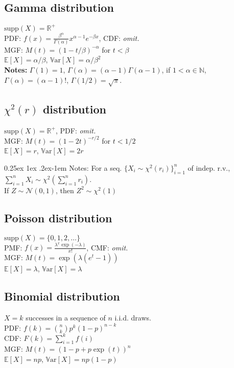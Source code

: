 \documentclass[9pt]{extarticle}
\makeatletter
\newcommand{\RR}{\mathbb{R}}
\newcommand{\NN}{\mathbb{N}}
\newcommand{\EE}{\mathbb{E}}
\newcommand{\var}{\mathbb{V}\text{ar}}
\renewcommand{\paragraph}{%
  \@startsection{paragraph}{4}%
  {\z@}{0.25ex \@plus 1ex \@minus .2ex}{-1em}%
  {\normalfont\normalsize\bfseries}%
}
\newenvironment{noshow}{}{}
\makeatother
\begin{document}
\begin{multicols*}{4}
\subsection*{Gamma distribution}
$\text{supp}(X) = \RR^+$ \\
PDF: $f(x) = \frac{\beta^\alpha}{\Gamma(\alpha)}x^{\alpha-1} e^{-\beta x}$, CDF: \emph{omit.} \\
MGF: $M(t) = (1 - t/\beta)^{-\alpha}$ for $t < \beta$ \\
$\EE[X] = \alpha/\beta$, $\var[X] = \alpha/\beta^2$ \\
\textbf{Notes:} $\Gamma(1) = 1$, $\Gamma(\alpha) = (\alpha - 1)\Gamma(\alpha-1)$, if $1 < \alpha \in \NN$, $\Gamma(\alpha) = (\alpha-1)!$, $\Gamma(1/2) = \sqrt{\pi}$.

\subsection*{$\chi^2(r)$ distribution}
$\text{supp}(X) = \mathbb{R}^+$, PDF: \emph{omit.} \\
MGF: $M(t) = (1-2t)^{-r/2}$ for $t < 1/2$ \\
$\EE[X] = r$, $\var[X] = 2r$

\paragraph{Notes:} For a seq. $\{X_i \sim \chi^2(r_i)\}_{i=1}^n$ of indep. r.v., $\sum_{i=1}^n X_i \sim \chi^2(\sum_{i=1}^n r_i)$.\\
If $Z \sim \mathcal{N}(0,1)$, then $Z^2 \sim \chi^2(1)$

\subsection*{Poisson distribution}
$\text{supp}(X) = \{0, 1, 2,  \ldots{}\}$ \\
PMF: $f(x) = \frac{\lambda^x \exp(-\lambda)}{x!}$, CMF: \emph{omit.} \\
MGF: $M(t) = \exp(\lambda(e^t - 1))$ \\
$\EE[X] = \lambda$, $\var[X] = \lambda$

\begin{noshow}
\subsection*{Binomial distribution}
$X = k$ successes in a sequence of $n$ i.i.d. draws.\\
PDF: $\displaystyle f(k) = \binom{n}{k} p^k (1-p)^{n-k}$ \\
CDF: $F(k) = \sum_{i=1}^k f(i)$ \\
MGF: $M(t) = (1-p +p \exp(t))^n$ \\
$\EE[X] = np$, $\var[X] = np(1-p)$


\end{noshow}
\end{multicols*}
\end{document}

